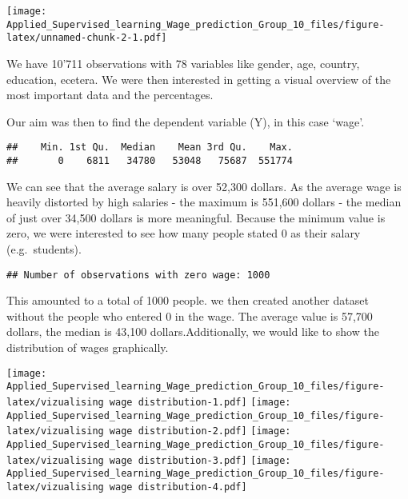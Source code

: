 \documentclass[
]{article}
\newenvironment{Shaded}{\begin{snugshade}}{\end{snugshade}}
\newcommand{\AttributeTok}[1]{\textcolor[rgb]{0.13,0.29,0.53}{#1}}
\newcommand{\CommentTok}[1]{\textcolor[rgb]{0.56,0.35,0.01}{\textit{#1}}}
\newcommand{\DecValTok}[1]{\textcolor[rgb]{0.00,0.00,0.81}{#1}}
\newcommand{\FunctionTok}[1]{\textcolor[rgb]{0.13,0.29,0.53}{\textbf{#1}}}
\newcommand{\NormalTok}[1]{#1}
\newcommand{\SpecialCharTok}[1]{\textcolor[rgb]{0.81,0.36,0.00}{\textbf{#1}}}
\newcommand{\StringTok}[1]{\textcolor[rgb]{0.31,0.60,0.02}{#1}}
\begin{document}
\begin{Shaded}
\end{Shaded}

\texttt{[image: Applied\_Supervised\_learning\_Wage\_prediction\_Group\_10\_files/figure-latex/unnamed-chunk-2-1.pdf]}

We have 10'711 observations with 78 variables like gender, age, country,
education, ecetera. We were then interested in getting a visual overview
of the most important data and the percentages.

Our aim was then to find the dependent variable (Y), in this case
`wage'.

\begin{Shaded}
\end{Shaded}

\begin{verbatim}
##    Min. 1st Qu.  Median    Mean 3rd Qu.    Max. 
##       0    6811   34780   53048   75687  551774
\end{verbatim}

We can see that the average salary is over 52,300 dollars. As the
average wage is heavily distorted by high salaries - the maximum is
551,600 dollars - the median of just over 34,500 dollars is more
meaningful. Because the minimum value is zero, we were interested to see
how many people stated 0 as their salary (e.g.~students).

\begin{verbatim}
## Number of observations with zero wage: 1000
\end{verbatim}

This amounted to a total of 1000 people. we then created another dataset
without the people who entered 0 in the wage. The average value is
57,700 dollars, the median is 43,100 dollars.Additionally, we would like
to show the distribution of wages graphically.

\texttt{[image: Applied\_Supervised\_learning\_Wage\_prediction\_Group\_10\_files/figure-latex/vizualising wage distribution-1.pdf]}
\texttt{[image: Applied\_Supervised\_learning\_Wage\_prediction\_Group\_10\_files/figure-latex/vizualising wage distribution-2.pdf]}
\texttt{[image: Applied\_Supervised\_learning\_Wage\_prediction\_Group\_10\_files/figure-latex/vizualising wage distribution-3.pdf]}
\texttt{[image: Applied\_Supervised\_learning\_Wage\_prediction\_Group\_10\_files/figure-latex/vizualising wage distribution-4.pdf]}
\end{document}
